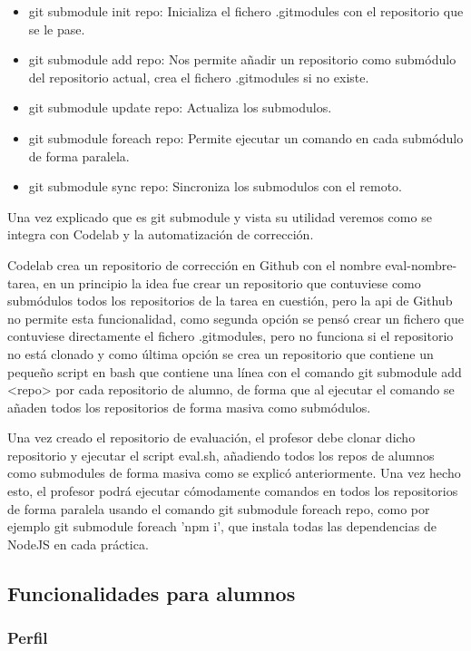 \begin{itemize}
\item git submodule init repo: Inicializa el fichero .gitmodules con el repositorio que se le pase.
\item git submodule add repo: Nos permite añadir un repositorio como submódulo del repositorio actual, crea el fichero .gitmodules si no existe.
\item git submodule update repo: Actualiza los submodulos.
\item git submodule foreach repo: Permite ejecutar un comando en cada submódulo de forma paralela.
\item git submodule sync repo: Sincroniza los submodulos con el remoto.
\end{itemize}

Una vez explicado que es git submodule y vista su utilidad veremos como se integra con Codelab y la automatización de corrección. 

Codelab crea un repositorio de corrección en Github con el nombre eval-nombre-tarea, en un principio la idea fue crear un repositorio que contuviese como submódulos todos los repositorios de la tarea en cuestión, pero la api de Github no permite esta funcionalidad, como segunda opción se pensó crear un fichero que contuviese directamente el fichero .gitmodules, pero no funciona si el repositorio no está clonado y como última opción se crea un repositorio que contiene un pequeño script en bash que contiene una línea con el comando git submodule add <repo> por cada repositorio de alumno, de forma que al ejecutar el comando se añaden todos los repositorios de forma masiva como submódulos.

Una vez creado el repositorio de evaluación, el profesor debe clonar dicho repositorio y ejecutar el script eval.sh, añadiendo todos los repos de alumnos como submodules de forma masiva como se explicó anteriormente. Una vez hecho esto, el profesor podrá ejecutar cómodamente comandos en todos los repositorios de forma paralela usando el comando git submodule foreach repo, como por ejemplo git submodule foreach 'npm i', que instala todas las dependencias de NodeJS en cada práctica.

\newpage 

\subsection{Funcionalidades para alumnos}
\label{3:6:3}

\subsubsection{Perfil}


